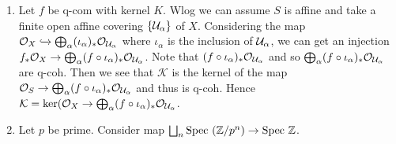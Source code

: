 \documentclass[10pt,a4paper]{article}
\begin{document}
\begin{enumerate}
\begin{enumerate}
\item Let $f$ be q-com with kernel $K$. Wlog we can assume $S$ is affine and take a finite open affine covering $\{\mathcal{U}_\alpha\}$ of $X$. Considering the map $\mathcal{O}_X\xhookrightarrow{}\bigoplus_\alpha(\iota_\alpha)_* \mathcal{O}_{\mathcal{U}_\alpha}$ where $\iota_\alpha$ is the inclusion of $\mathcal{U}_\alpha$, we can get an injection $f_*\mathcal{O}_X\to\bigoplus_\alpha(f\circ \iota_\alpha)_* \mathcal{O}_{\mathcal{U}_\alpha}$. Note that $(f\circ \iota_\alpha)_* \mathcal{O}_{\mathcal{U}_\alpha}$ and so $\bigoplus_\alpha(f\circ \iota_\alpha)_* \mathcal{O}_{\mathcal{U}_\alpha}$ are q-coh. Then we see that $\mathcal{K}$ is the kernel of the map $\mathcal{O}_S\to \bigoplus_\alpha(f\circ \iota_\alpha)_* \mathcal{O}_{\mathcal{U}_\alpha}$ and thus is q-coh. Hence $\mathcal{K}  = \ker (\mathcal{O}_X\to \bigoplus_\alpha(f\circ \iota_\alpha)_* \mathcal{O}_{\mathcal{U}_\alpha}$.
\item Let $p$ be prime. Consider map  $\bigsqcup_n \text{Spec }(\mathbb{Z}/p^n)\to \text{Spec } \mathbb{Z}$.
\end{enumerate}
\end{enumerate}
\end{document}

